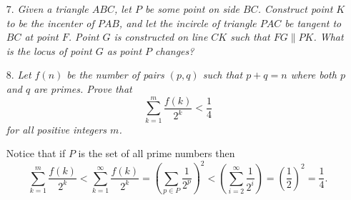 \documentclass{article}
\begin{document}
\begin{enumerate}
\medskip
\item[7.] %
\textit{Given a triangle $ABC$, let $P$ be some point on side $BC$. Construct point $K$ to be the incenter of $PAB$, and let the incircle of triangle $PAC$ be tangent to $BC$ at point $F$. Point $G$ is constructed on line $CK$ such that $FG \parallel PK$. What is the locus of point $G$ as point $P$ changes?}



\medskip
\item[8.] %
\textit{Let $f(n)$ be the number of pairs $(p, q)$ such that $p + q = n$ where both $p$ and $q$ are primes. Prove that
$$\sum_{k = 1}^{m} \frac{f(k)}{2^k} < \frac{1}{4}$$
for all positive integers $m$.}

Notice that if $P$ is the set of all prime numbers then
$$\sum_{k = 1}^{m} \frac{f(k)}{2^k} < \sum_{k = 1}^{\infty} \frac{f(k)}{2^k} = (\sum_{p \in P} \frac{1}{2^p})^2 < (\sum_{i = 2}^{\infty} \frac{1}{2^i}) = (\frac{1}{2})^2 = \frac{1}{4}.$$

\end{enumerate}
\end{document}
